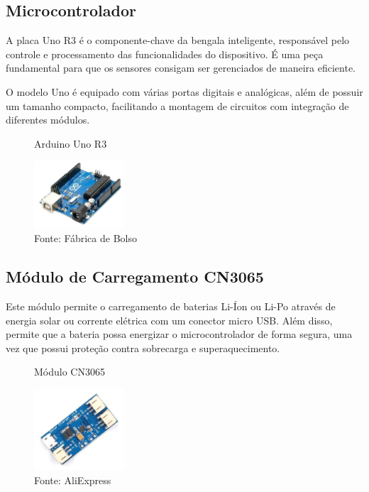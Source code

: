     \subsection{Microcontrolador}
    A placa Uno R3 é o componente-chave da bengala inteligente, responsável pelo controle e processamento das funcionalidades do dispositivo. É uma peça fundamental para que os sensores consigam ser gerenciados de maneira eficiente. 

    O modelo Uno é equipado com várias portas digitais e analógicas, além de possuir um tamanho compacto, facilitando a montagem de circuitos com integração de diferentes módulos.

    \begin{figure}[h!]
        \captionsetup{width=1\textwidth}
        \caption{\label{fig:arduino} Arduino Uno R3}
        \centering
        \includegraphics[width=0.3\textwidth]{figuras/arduino} 
        \caption*{Fonte: Fábrica de Bolso}
    \end{figure}

    \subsection{Módulo de Carregamento CN3065}
    Este módulo permite o carregamento de baterias Li-Íon ou Li-Po através de energia solar ou corrente elétrica  com um conector micro USB. Além disso, permite que a bateria possa energizar o microcontrolador de forma segura, uma vez que possui proteção contra sobrecarga e superaquecimento.
    
    \begin{figure}[h!]
        \captionsetup{width=1\textwidth}
        \caption{\label{fig:cn3065} Módulo CN3065}
        \centering
        \includegraphics[width=0.3\textwidth]{figuras/cn3065} 
        \caption*{Fonte: AliExpress}
    \end{figure}

